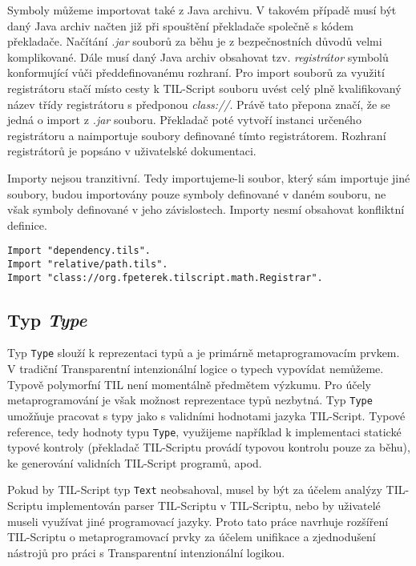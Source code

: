 Symboly můžeme importovat také z Java archivu. V takovém případě musí být daný Java archiv načten
již při spouštění překladače společně s kódem překladače. Načítání \textit{.jar} souborů za běhu
je z bezpečnostních důvodů velmi komplikované. Dále musí daný Java archiv obsahovat tzv.
\textit{registrátor} symbolů konformující vůči předdefinovanému rozhraní. Pro import souborů
za využití registrátoru stačí místo cesty k TIL-Script souboru uvést celý plně kvalifikovaný název
třídy registrátoru s předponou \textit{class://}. Právě tato přepona značí, že se jedná o import
z \textit{.jar} souboru. Překladač poté vytvoří instanci určeného registrátoru a naimportuje
soubory definované tímto registrátorem. Rozhraní registrátorů je popsáno v uživatelské dokumentaci.

Importy nejsou tranzitivní. Tedy importujeme-li soubor, který sám importuje jiné soubory, budou
importovány pouze symboly definované v daném souboru, ne však symboly definované v jeho
závislostech. Importy nesmí obsahovat konfliktní definice.

\begin{lstlisting}[caption={Příklad využití výrazů Import}]
Import "dependency.tils".
Import "relative/path.tils".
Import "class://org.fpeterek.tilscript.math.Registrar".
\end{lstlisting}

\subsection{Typ \textit{Type}}

Typ \lstinline{Type} slouží k reprezentaci typů a je primárně metaprogramovacím prvkem. V tradiční
Transparentní intenzionální logice o typech vypovídat nemůžeme. Typově polymorfní TIL není
momentálně předmětem výzkumu. Pro účely metaprogramování je však možnost reprezentace typů
nezbytná. Typ \lstinline{Type} umožňuje pracovat s typy jako s validními hodnotami jazyka
TIL-Script. Typové reference, tedy hodnoty typu \lstinline{Type}, využijeme například k implementaci
statické typové kontroly (překladač TIL-Scriptu provádí typovou kontrolu pouze za běhu),
ke generování validních TIL-Script programů, apod.

Pokud by TIL-Script typ \lstinline{Text} neobsahoval, musel by být za účelem analýzy TIL-Scriptu
implementován parser TIL-Scriptu v TIL-Scriptu, nebo by uživatelé museli využívat jiné programovací
jazyky. Proto tato práce navrhuje rozšíření TIL-Scriptu o metaprogramovací prvky za účelem unifikace
a zjednodušení nástrojů pro práci s Transparentní intenzionální logikou.

